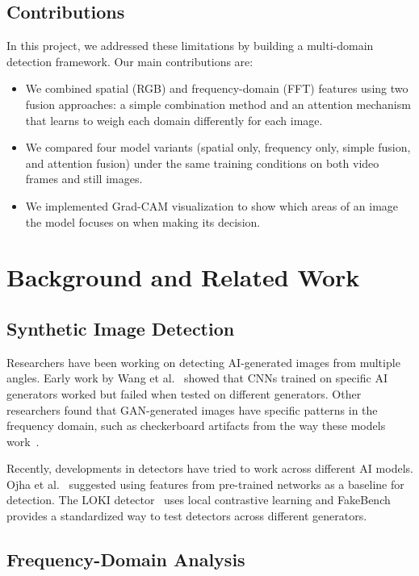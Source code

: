 \documentclass{article}
\begin{document}
\subsection{Contributions}

In this project, we addressed these limitations by building a multi-domain detection framework. Our main contributions are:

\begin{itemize}
  \item We combined spatial (RGB) and frequency-domain (FFT) features using two fusion approaches: a simple combination method and an attention mechanism that learns to weigh each domain differently for each image.
  \item We compared four model variants (spatial only, frequency only, simple fusion, and attention fusion) under the same training conditions on both video frames and still images.
  \item We implemented Grad-CAM visualization to show which areas of an image the model focuses on when making its decision.
\end{itemize}

\section{Background and Related Work}

\subsection{Synthetic Image Detection}

Researchers have been working on detecting AI-generated images from multiple angles. Early work by Wang et al.~\cite{wang2020cnn} showed that CNNs trained on specific AI generators worked but failed when tested on different generators. Other researchers found that GAN-generated images have specific patterns in the frequency domain, such as checkerboard artifacts from the way these models work~\cite{zhang2023frequency}.

Recently, developments in detectors have tried to work across different AI models. Ojha et al.~\cite{ojha2023universal} suggested using features from pre-trained networks as a baseline for detection. The LOKI detector~\cite{tan2023loki} uses local contrastive learning and FakeBench~\cite{fu2024fakebench} provides a standardized way to test detectors across different generators.

\subsection{Frequency-Domain Analysis}
\end{document}
